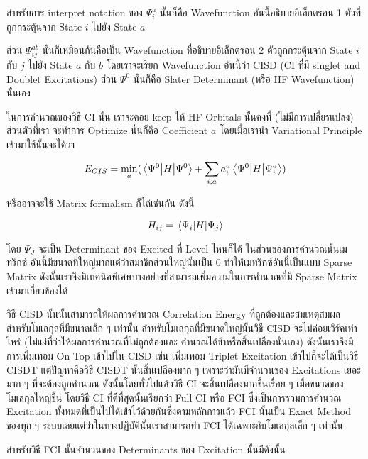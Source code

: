 สำหรับการ interpret notation ของ $\Psi^{a}_{i}$ นั้นก็คือ Wavefunction อันนี้อธิบายอิเล็กตรอน 1
ตัวที่ถูกกระตุ้นจาก State $i$ ไปยัง State $a$

ส่วน $\Psi^{ab}_{ij}$ นั้นก็เหมือนกันคือเป็น Wavefunction ที่อธิบายอิเล็กตรอน 2 ตัวถูกกระตุ้นจาก
State $i$ กับ $j$ ไปยัง State $a$ กับ $b$ โดยเราจะเรียก Wavefunction อันนี้ว่า CISD (CI ที่มี singlet
and Doublet Excitations) ส่วน $\Psi^{0}$ นั้นก็คือ Slater Determinant (หรือ HF Wavefunction)
นั่นเอง

ในการคำนวณของวิธี CI นั้น เราจะคอย keep ให้ HF Orbitals นั้นคงที่ (ไม่มีการเปลี่ยรแปลง) ส่วนตัวที่เรา%
จะทำการ Optimize นั่นก็คือ Coefficient $a$ โดยเมื่อเรานำ Variational Principle เข้ามาใช้นั้นจะได้ว่า

\begin{equation}
    E_{CIS} = \min_{a} ( \mel{\Psi^{0}}{H}{\Psi^{0}}
    + \sum_{i,a} a^{a}_{i} \mel{\Psi^{0}}{H}{\Psi^{a}_{i}} )
\end{equation}

\noindent หรืออาจจะใช้ Matrix formalism ก็ได้เช่นกัน ดังนี้

\begin{equation}
    H_{ij} = \mel{\Psi_{i}}{H}{\Psi_{j}}
\end{equation}

โดย $\Psi_{J}$ จะเป็น Determinant ของ Excited ที่ Level ไหนก็ได้ ในส่วนของการคำนวณนั้นเมทริกซ์%
อันนี้มีขนาดที่ใหญ่มากแต่ว่าสมาชิกส่วนใหญ่นั้นเป็น 0 ทำให้เมทริกซ์อันนี้เป็นแบบ Sparse Matrix
ดังนั้นเราจึงมีเทคนิคพิเศษบางอย่างที่สามารถเพิ่มความในการคำนวณที่มี Sparse Matrix เข้ามาเกี่ยวข้องได้

วิธี CISD นั้นนั้นสามารถให้ผลการคำนวณ Correlation Energy ที่ถูกต้องและสมเหตุสมผลสำหรับโมเลกุลที่มีขนาดเล็ก ๆ
เท่านั้น สำหรับโมเลกุลที่มีขนาดใหญ่นั้นวิธี CISD จะไม่ค่อยเวิร์คเท่าไหร่ (ไม่แง่ที่ว่าให้ผลการคำนวณที่ไม่ถูกต้องและ%
คำนวณได้ช้าหรือสิ้นเปลืองนั่นเอง) ดังนั้นเราจึงมีการเพิ่มเทอม On Top เข้าไปใน CISD เช่น เพิ่มเทอม Triplet
Excitation เข้าไปก็จะได้เป็นวิธี CISDT แต่ปัญหาคือวิธี CISDT นั้นสิ้นเปลืองมาก ๆ เพราะว่ามันมีจำนวนของ
Excitations เยอะมาก ๆ ที่จะต้องถูกคำนวณ ดังนั้นโดยทั่วไปแล้ววิธี CI จะสิ้นเปลืองมากขึ้นเรื่อย ๆ
เมื่อขนาดของโมเลกุลใหญ่ขึ้น โดยวิธี CI ที่ดีที่สุดนั้นเรียกว่า Full CI หรือ FCI ซึ่งเป็นการรวมการคำนวณ
Excitation ทั้งหมดที่เป็นไปได้เข้าไว้ด้วยกันซึ่งตามหลักการแล้ว FCI นั้นเป็น Exact Method ของทุก ๆ
ระบบเลยแต่ว่าในทางปฏิบัตินั้นเราสามารถทำ FCI ได้เฉพาะกับโมเลกุลเล็ก ๆ เท่านั้น

สำหรับวิธี FCI นั้นจำนวนของ Determinants ของ Excitation นั้นมีดังนั้น

